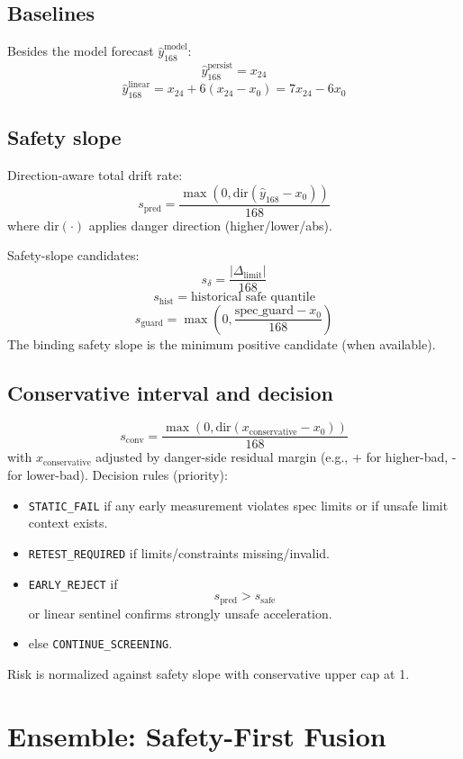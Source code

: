 \documentclass[11pt]{article}
\begin{document}
\subsection{Baselines}
Besides the model forecast \(\hat y_{168}^{\text{model}}\):
\[
\hat y_{168}^{\text{persist}}=x_{24}
\]
\[
\hat y_{168}^{\text{linear}} = x_{24} + 6(x_{24}-x_0)=7x_{24}-6x_0
\]

\subsection{Safety slope}
Direction-aware total drift rate:
\[
 s_{\mathrm{pred}} = \frac{\max(0,\mathrm{dir}(\hat y_{168}-x_0))}{168}
\]
where \(\mathrm{dir}(\cdot)\) applies danger direction (higher/lower/abs).

Safety-slope candidates:
\[
 s_{\delta} = \frac{|\Delta_{\mathrm{limit}}|}{168}
\]
\[
 s_{\mathrm{hist}}=\text{historical safe quantile}
\]
\[
 s_{\mathrm{guard}}=\max\left(0,\frac{\text{spec\_guard}-x_0}{168}\right)
\]
The binding safety slope is the minimum positive candidate (when available).

\subsection{Conservative interval and decision}
\[
 s_{\mathrm{conv}} = \frac{\max(0,\mathrm{dir}(x_{\text{conservative}}-x_0))}{168}
\]
with \(x_{\text{conservative}}\) adjusted by danger-side residual margin (e.g., + for higher-bad, - for lower-bad).  
Decision rules (priority):
\begin{itemize}[nosep]
  \item \texttt{STATIC\_FAIL} if any early measurement violates spec limits or if unsafe limit context exists.
  \item \texttt{RETEST\_REQUIRED} if limits/constraints missing/invalid.
  \item \texttt{EARLY\_REJECT} if
  \[
  s_{\mathrm{pred}}>s_{\mathrm{safe}}
  \]
  or linear sentinel confirms strongly unsafe acceleration.
  \item else \texttt{CONTINUE\_SCREENING}.
\end{itemize}
Risk is normalized against safety slope with conservative upper cap at 1.

\section{Ensemble: Safety-First Fusion}
\end{document}
